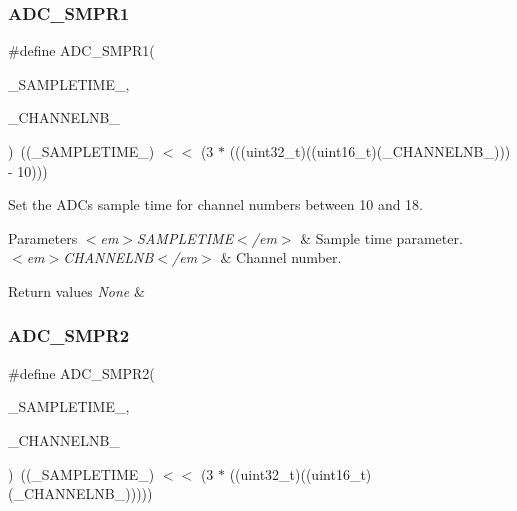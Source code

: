 \subsubsection{\texorpdfstring{ADC\_SMPR1}{ADC\_SMPR1}}
{\footnotesize\ttfamily \#define A\+D\+C\+\_\+\+S\+M\+P\+R1(\begin{DoxyParamCaption}\item[{}]{\+\_\+\+S\+A\+M\+P\+L\+E\+T\+I\+M\+E\+\_\+,  }\item[{}]{\+\_\+\+C\+H\+A\+N\+N\+E\+L\+N\+B\+\_\+ }\end{DoxyParamCaption})~((\+\_\+\+S\+A\+M\+P\+L\+E\+T\+I\+M\+E\+\_\+) $<$$<$ (3 $\ast$ (((uint32\+\_\+t)((uint16\+\_\+t)(\+\_\+\+C\+H\+A\+N\+N\+E\+L\+N\+B\+\_\+))) -\/ 10)))}



Set the A\+DC\textquotesingle{}s sample time for channel numbers between 10 and 18. 


\begin{DoxyParams}{Parameters}
{\em $<$em$>$\+S\+A\+M\+P\+L\+E\+T\+I\+M\+E$<$/em$>$} & Sample time parameter. \\
\hline
{\em $<$em$>$\+C\+H\+A\+N\+N\+E\+L\+N\+B$<$/em$>$} & Channel number.\\
\hline
\end{DoxyParams}

\begin{DoxyRetVals}{Return values}
{\em None} & \\
\hline
\end{DoxyRetVals}
\mbox{\label{group___a_d_c___private___macros_gaeb66714538d978d4d336a4a6ef0d58bc}} 
\subsubsection{\texorpdfstring{ADC\_SMPR2}{ADC\_SMPR2}}
{\footnotesize\ttfamily \#define A\+D\+C\+\_\+\+S\+M\+P\+R2(\begin{DoxyParamCaption}\item[{}]{\+\_\+\+S\+A\+M\+P\+L\+E\+T\+I\+M\+E\+\_\+,  }\item[{}]{\+\_\+\+C\+H\+A\+N\+N\+E\+L\+N\+B\+\_\+ }\end{DoxyParamCaption})~((\+\_\+\+S\+A\+M\+P\+L\+E\+T\+I\+M\+E\+\_\+) $<$$<$ (3 $\ast$ ((uint32\+\_\+t)((uint16\+\_\+t)(\+\_\+\+C\+H\+A\+N\+N\+E\+L\+N\+B\+\_\+)))))}



